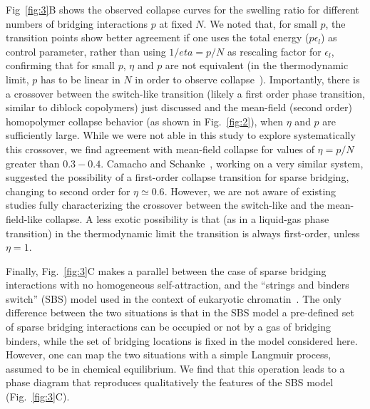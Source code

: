 \documentclass[
preprint,
a4paper,
12pt,
superscriptaddress,
pre]{revtex4}
\begin{document}
%
Fig~\ref{fig:3}B shows the observed collapse curves for the swelling
ratio for different numbers of bridging interactions $p$ at fixed
$N$. 
%
We noted that, for small $p$, the transition points show better
agreement if one uses the total energy ($p \epsilon_l$) as control
parameter, rather than using $1/eta=p/N$ as rescaling factor for
$\epsilon_l$, confirming that for small $p$, $\eta$ and $p$ are not
equivalent (in the thermodynamic limit, $p$ has to be linear in $N$ in
order to observe collapse~\cite{Kantor1996,Camacho1997}).
%
Importantly, there is a crossover between the switch-like transition
(likely a first order phase transition, similar to diblock copolymers)
just discussed and the  mean-field (second order) homopolymer collapse
behavior (as shown in Fig.~\ref{fig:2}), when $\eta$ and $p$ are
sufficiently large.
While we were not able in this study to explore systematically this
crossover, we find agreement with mean-field collapse for values of
$\eta = p/N$ greater than $0.3-0.4$.
Camacho and Schanke~\cite{Camacho1997}, working on a very similar
system, suggested the possibility of a first-order collapse transition
for sparse bridging, changing to second order for $\eta \simeq 0.6$.
However, we are not aware of existing studies fully characterizing the
crossover between the switch-like and the mean-field-like collapse. A
less exotic possibility is that (as in a liquid-gas phase transition)
in the thermodynamic limit the transition is always first-order,
unless $\eta=1$.
%
%



Finally, Fig.~\ref{fig:3}C makes a parallel between the case of
sparse bridging interactions with no homogeneous self-attraction, and
the ``strings and binders switch'' (SBS) model used in the context of
eukaryotic chromatin~\cite{Barbieri2012,Barbieri2013b}.
The only difference between the two situations is that in the SBS
model a pre-defined set of sparse bridging interactions can be
occupied or not by a gas of bridging binders, while the set of
bridging locations is fixed in the model considered here. However, one
can map the two situations with a simple Langmuir process, assumed to
be in chemical equilibrium. We find that this operation leads to a
phase diagram that reproduces qualitatively the features of the SBS
model (Fig.~\ref{fig:3}C).
\end{document}
